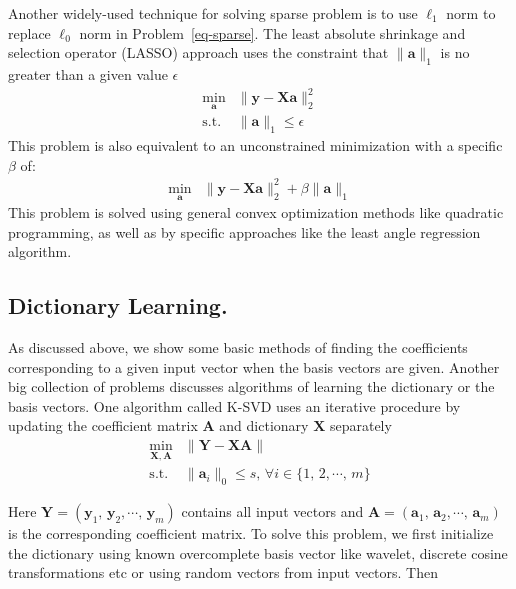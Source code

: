 Another widely-used technique for solving sparse problem is to use $\ell_1$ norm to replace $\ell_0$ norm in Problem~\ref{eq-sparse}.
The least absolute shrinkage and selection operator (LASSO) approach uses the constraint that $\|\mathbf{a}\|_1$ is no greater than a given value $\epsilon$
\begin{equation}
\begin{array}{cl}
\min_{\mathbf{a}} & \|\mathbf{y}-\mathbf{X}\mathbf{a}\|_2^2\\
\mathrm{s.t.} & \|\mathbf{a}\|_1 \leq \epsilon
\end{array}
\end{equation}
This problem is also equivalent to an unconstrained minimization with a specific $\beta$ of:
\begin{equation}
\begin{array}{cl}
\min_{\mathbf{a}} & \|\mathbf{y}-\mathbf{X}\mathbf{a}\|_2^2 + \beta \|\mathbf{a}\|_1
\end{array}
\end{equation}
This problem is solved using general convex optimization methods like quadratic programming, as well as by specific approaches like the least angle regression algorithm.

\subsection{Dictionary Learning.}
As discussed above, we show some basic methods of finding the coefficients corresponding to a given input vector when the basis vectors are given.
Another big collection of problems discusses algorithms of learning the dictionary or the basis vectors.
One algorithm called K-SVD uses an iterative procedure by updating the coefficient matrix $\mathbf{A}$ and dictionary $\mathbf{X}$ separately
\begin{equation}
\begin{array}{cl}
\min_{\mathbf{X},\mathbf{A}} & \|\mathbf{Y}-\mathbf{X}\mathbf{A}\| \\
\mathrm{s.t.} & \|\mathbf{a}_i\|_0 \leq s,\,\forall i\in\{1,\,2,\cdots ,\,m\}
\end{array}
\end{equation}

Here $\mathbf{Y}=(\mathbf{y}_1,\,\mathbf{y}_2,\cdots ,\,\mathbf{y}_m)$ contains all input vectors and $\mathbf{A} = (\mathbf{a}_1,\,\mathbf{a}_2,\cdots ,\,\mathbf{a}_m)$ is the corresponding coefficient matrix.
To solve this problem, we first initialize the dictionary using known overcomplete basis vector like wavelet, discrete cosine transformations etc or using random vectors from  input vectors.
Then

